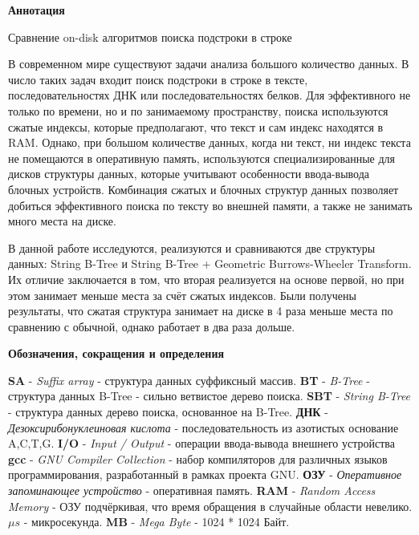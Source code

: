 \documentclass[a4paper,12pt]{article}
\begin{document}
\begin{center}
    \textbf{Аннотация}
\end{center}

\begin{center}
    Сравнение on-disk алгоритмов поиска подстроки в строке
\end{center}

В современном мире существуют задачи анализа большого количество данных. В число таких задач входит поиск подстроки в строке в тексте, последовательностях ДНК или последовательностях белков. Для эффективного не только по времени, но и по занимаемому пространству, поиска используются сжатые индексы, которые предполагают, что текст и сам индекс находятся в RAM. Однако, при большом количестве данных, когда ни текст, ни индекс текста не помещаются в оперативную память, используются специализированные для дисков структуры данных, которые учитывают особенности ввода-вывода блочных устройств. Комбинация сжатых и блочных структур данных позволяет добиться эффективного поиска по тексту во внешней памяти, а также не занимать много места на диске.

В данной работе исследуются, реализуются и сравниваются две структуры данных: String B-Tree и String B-Tree + Geometric Burrows-Wheeler Transform. Их отличие заключается в том, что вторая реализуется на основе первой, но при этом занимает меньше места за счёт сжатых индексов. Были получены результаты, что сжатая структура занимает на диске в 4 раза меньше места по сравнению с обычной, однако работает в два раза дольше.

\newpage

\begin{center}
    \textbf{Обозначения, сокращения и определения}
\end{center}

\noindent
\textbf{SA} - \textit{Suffix array} - структура данных суффиксный массив.\newline
\textbf{BT} - \textit{B-Tree} - структура данных B-Tree - сильно ветвистое дерево поиска.\newline
\textbf{SBT} - \textit{String B-Tree} - структура данных дерево поиска, основанное на B-Tree.\newline
\textbf{ДНК} - \textit{Дезоксирибонуклеиновая кислота} - последовательность из азотистых основание A,C,T,G.\newline
\textbf{I/O} - \textit{Input / Output} - операции ввода-вывода внешнего устройства \newline
\textbf{gcc} - \textit{GNU Compiler Collection} - набор компиляторов для различных языков программирования, разработанный в рамках проекта GNU.\newline
\textbf{ОЗУ} - \textit{Оперативное запоминающее устройство } - оперативная память. \newline
\textbf{RAM} - \textit{ Random Access Memory } - ОЗУ подчёркивая, что время обращения в случайные области невелико. \newline
\textbf{$\mu s$} - микросекунда. \newline
\textbf{MB} - \textit{Mega Byte} - 1024 * 1024 Байт. \newline
\end{document}
